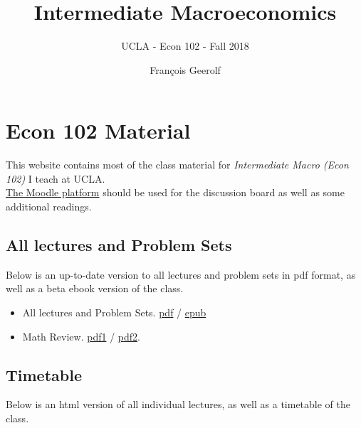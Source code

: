 \documentclass[]{book}
\title{Intermediate Macroeconomics}
\subtitle{UCLA - Econ 102 - Fall 2018}
\author{François Geerolf}
\date{}
\providecommand{\tightlist}{%
  \setlength{\itemsep}{0pt}\setlength{\parskip}{0pt}}
\theoremstyle{definition}
\theoremstyle{definition}
\theoremstyle{definition}
\theoremstyle{remark}
\begin{document}
\maketitle

{
\setcounter{tocdepth}{2}
\tableofcontents
}
\listoftables
\listoffigures
\chapter*{Econ 102 Material}\label{econ-102-material}

This website contains most of the class material for \emph{Intermediate
Macro (Econ 102)} I teach at UCLA.\\
\href{https://moodle2.sscnet.ucla.edu/course/view/18F-ECON102-1}{The
Moodle platform} should be used for the discussion board as well as some
additional readings.

\section*{All lectures and Problem
Sets}\label{all-lectures-and-problem-sets}

Below is an up-to-date version to all lectures and problem sets in pdf
format, as well as a beta ebook version of the class.

\begin{itemize}
\tightlist
\item
  All lectures and Problem Sets. \href{ucla-102-fall2018.pdf}{pdf} /
  \href{ucla-102-fall2018.epub}{epub}
\item
  Math Review. \href{old/calculus-review.pdf}{pdf1} /
  \href{old/calculus-review2.pdf}{pdf2}.
\end{itemize}

\section*{Timetable}\label{timetable}

Below is an html version of all individual lectures, as well as a
timetable of the class.
\end{document}
